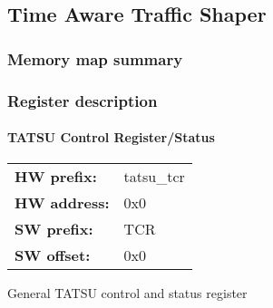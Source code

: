 \subsection{Time Aware Traffic Shaper}
\label{subsec:wbgen:tatsu}

\subsubsection{Memory map summary}

\subsubsection{Register description}
\paragraph*{TATSU Control Register/Status}\vspace{12pt}

\begin{tabular}{l l }
{\bf HW prefix:}  & tatsu\_tcr\\
{\bf HW address:}  & 0x0\\
{\bf SW prefix:}  & TCR\\
{\bf SW offset:}  & 0x0\\
\end{tabular}

\vspace{12pt}
General TATSU control and status register

